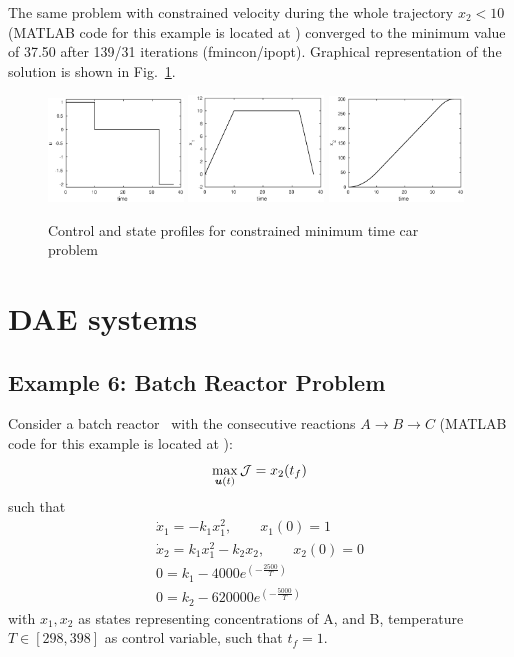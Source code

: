 The same problem with constrained velocity during the whole trajectory
$x_2 < 10$ (MATLAB code for this example is located at
) converged to the minimum value of 37.50
after 139/31 iterations (fmincon/ipopt). Graphical representation of
the solution is shown in Fig.~\ref{fig:car2}.


\begin{figure}[htb]
\includegraphics[width=0.32\textwidth]{examples/problem-car2/car_u.eps}
\includegraphics[width=0.32\textwidth]{examples/problem-car2/car_x1.eps}
\includegraphics[width=0.32\textwidth]{examples/problem-car2/car_x2.eps}
\caption{Control and state profiles for
  constrained minimum time car problem} \label{fig:car2} 
\end{figure}

\section{DAE systems}
\label{sec:daes}

\subsection{Example 6: Batch Reactor Problem}
\label{sec:brpdae}

Consider a batch reactor~\citep{raj01,dad95} with the 
consecutive reactions $A \rightarrow B\rightarrow C$ (MATLAB code for this example is located
at ):
\begin{equation}
\max_{\ve{u}(t)} \mf{J} = x_{2}(t_{f}) \label{eq:batch_dae}
\end{equation}
such that
\begin{gather}
\dot{x}_{1} = -k_{1}x_{1}^{2}, \qquad x_1(0) = 1 \\
\dot{x}_{2} = k_{1}x_{1}^{2} - k_{2}x_{2}, \qquad x_2(0) = 0 \\
0 = k_{1} - 4000e^{(-\frac{2500}{T})} \\
0 = k_{2} - 620000e^{(-\frac{5000}{T})} 
\end{gather} with $x_{1}, x_{2}$ as states representing concentrations
of A, and B, temperature $T \in [298,398]$ as control variable, such
that $t_{f} = 1$.

